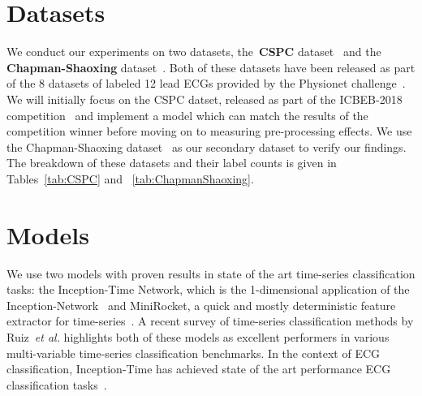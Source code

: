 \documentclass{article}
\begin{document}
\section{Datasets}
\label{datasets}
We conduct our experiments on two datasets, the~\textbf{CSPC} dataset~\cite{liu2018open} and the \textbf{Chapman-Shaoxing} dataset~\cite{zheng202012}. Both of these datasets have been released as part of the 8 datasets of labeled 12 lead ECGs provided by the Physionet challenge~\cite{reyna2021will,reyna4issues}. We will initially focus on the CSPC datset, released as part of the ICBEB-2018 competition~\cite{liu2018open} and implement a model which can match the results of the competition winner before moving on to measuring pre-processing effects. We use the Chapman-Shaoxing dataset~\cite{zheng202012} as our secondary dataset to verify our findings. The breakdown of these datasets and their label counts is given in Tables~\ref{tab:CSPC} and ~\ref{tab:ChapmanShaoxing}.

\section{Models}
\label{sec:models}
We use two models with proven results in state of the art time-series classification tasks: the Inception-Time Network, which is the 1-dimensional application of the Inception-Network~\cite{szegedy2017inception,ismail2020inceptiontime} and MiniRocket, a quick and mostly deterministic feature extractor for time-series~\cite{dempster2021minirocket}. A recent survey of time-series classification methods by Ruiz~\textit{et al.} highlights both of these models as excellent performers in various multi-variable time-series classification benchmarks. In the context of ECG classification, Inception-Time has achieved state of the art performance ECG classification tasks~\cite{Strodthoff2021}. 
\end{document}
